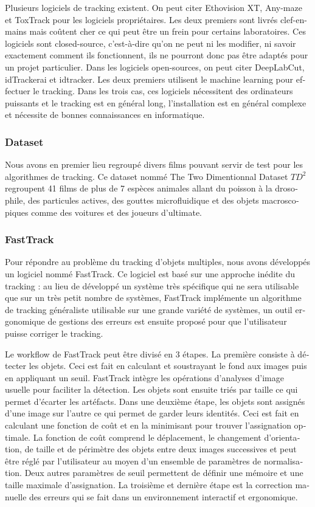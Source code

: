 \begin{otherlanguage}{french}
Plusieurs logiciels de tracking existent. On peut citer Ethovision XT, Any-maze et ToxTrack pour les logiciels propriétaires. Les deux premiers sont livrés clef-en-mains mais coûtent cher ce qui peut être un frein pour certains laboratoires. Ces logiciels sont closed-source, c’est-à-dire qu'on ne peut ni les modifier, ni savoir exactement comment ils fonctionnent, ils ne pourront donc pas être adaptés pour un projet particulier. Dans les logiciels open-sources, on peut citer DeepLabCut, idTrackerai et idtracker. Les deux premiers utilisent le machine learning pour effectuer le tracking. Dans les trois cas, ces logiciels nécessitent des ordinateurs puissants et le tracking est en général long, l'installation est en général complexe et nécessite de bonnes connaissances en informatique.

\subsubsection*{Dataset}
Nous avons en premier lieu regroupé divers films pouvant servir de test pour les algorithmes de tracking. Ce dataset nommé The Two Dimentionnal Dataset $TD^2$ regroupent 41 films de plus de 7 espèces animales allant du poisson à la drosophile, des particules actives, des gouttes microfluidique et des objets macroscopiques comme des voitures et des joueurs d'ultimate.

\subsubsection*{FastTrack}
Pour répondre au problème du tracking d'objets multiples, nous avons développés un logiciel nommé FastTrack. Ce logiciel est basé sur une approche inédite du tracking : au lieu de développé un système très spécifique qui ne sera utilisable que sur un très petit nombre de systèmes, FastTrack implémente un algorithme de tracking généraliste utilisable sur une grande variété de systèmes, un outil ergonomique de gestions des erreurs est ensuite proposé pour que l'utilisateur puisse corriger le tracking.

Le workflow de FastTrack peut être divisé en 3 étapes. La première consiste à détecter les objets. Ceci est fait en calculant et soustrayant le fond aux images puis en appliquant un seuil. FastTrack intègre les opérations d'analyses d'image usuelle pour faciliter la détection. Les objets sont ensuite triés par taille ce qui permet d'écarter les artéfacts. Dans une deuxième étape, les objets sont assignés d'une image sur l'autre ce qui permet de garder leurs identités. Ceci est fait en calculant une fonction de coût et en la minimisant pour trouver l'assignation optimale. La fonction de coût comprend le déplacement, le changement d'orientation, de taille et de périmètre des objets entre deux images successives et peut être réglé par l'utilisateur au moyen d'un ensemble de paramètres de normalisation. Deux autres paramètres de seuil permettent de définir une mémoire et une taille maximale d'assignation. La troisième et dernière étape est la correction manuelle des erreurs qui se fait dans un environnement interactif et ergonomique.


\end{otherlanguage}
